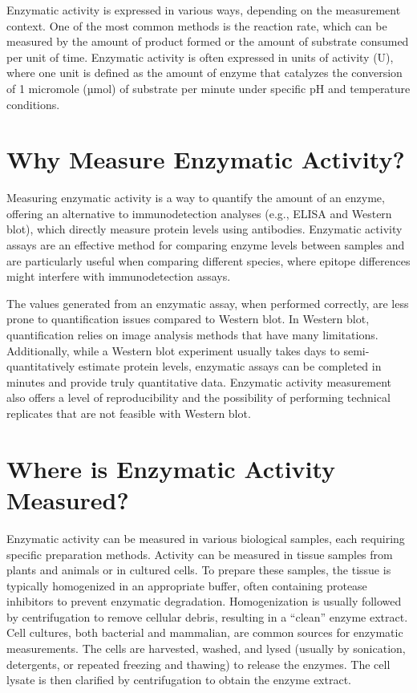 \documentclass[
  9pt,
  american,
  a5paper,
  extrafontsizes,onecolumn,openright
  ]{memoir}
\newlength{\rf}
\begin{document}
Enzymatic activity is expressed in various ways, depending on the measurement context. One of the most common methods is the reaction rate, which can be measured by the amount of product formed or the amount of substrate consumed per unit of time. Enzymatic activity is often expressed in units of activity (U), where one unit is defined as the amount of enzyme that catalyzes the conversion of 1 micromole (µmol) of substrate per minute under specific pH and temperature conditions.

\section{Why Measure Enzymatic Activity?}\label{why-measure-enzymatic-activity}

Measuring enzymatic activity is a way to quantify the amount of an enzyme, offering an alternative to immunodetection analyses (e.g., ELISA and Western blot), which directly measure protein levels using antibodies. Enzymatic activity assays are an effective method for comparing enzyme levels between samples and are particularly useful when comparing different species, where epitope differences might interfere with immunodetection assays.

The values generated from an enzymatic assay, when performed correctly, are less prone to quantification issues compared to Western blot. In Western blot, quantification relies on image analysis methods that have many limitations. Additionally, while a Western blot experiment usually takes days to semi-quantitatively estimate protein levels, enzymatic assays can be completed in minutes and provide truly quantitative data. Enzymatic activity measurement also offers a level of reproducibility and the possibility of performing technical replicates that are not feasible with Western blot.

\section{Where is Enzymatic Activity Measured?}\label{where-is-enzymatic-activity-measured}

Enzymatic activity can be measured in various biological samples, each requiring specific preparation methods. Activity can be measured in tissue samples from plants and animals or in cultured cells. To prepare these samples, the tissue is typically homogenized in an appropriate buffer, often containing protease inhibitors to prevent enzymatic degradation. Homogenization is usually followed by centrifugation to remove cellular debris, resulting in a \enquote{clean} enzyme extract. Cell cultures, both bacterial and mammalian, are common sources for enzymatic measurements. The cells are harvested, washed, and lysed (usually by sonication, detergents, or repeated freezing and thawing) to release the enzymes. The cell lysate is then clarified by centrifugation to obtain the enzyme extract.
\end{document}
